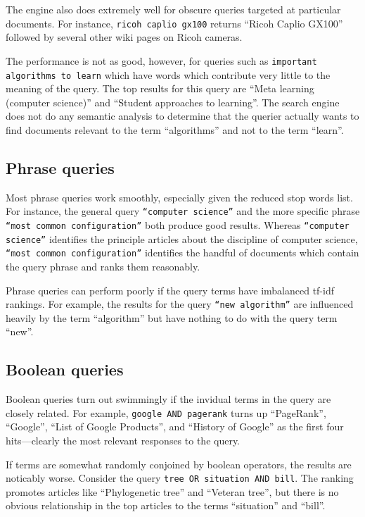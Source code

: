 \documentclass[11pt]{article}
\begin{document}
The engine also does extremely well for obscure queries targeted at particular documents.
For instance, \texttt{ricoh caplio gx100} returns ``Ricoh Caplio GX100'' followed by
several other wiki pages on Ricoh cameras.

The performance is not as good, however, for queries such as \texttt{important
algorithms to learn} which have words which contribute very little to the meaning of the query.
The top results for this query are ``Meta learning (computer science)'' and ``Student approaches
to learning''. The search engine does not do any semantic analysis to determine that the querier
actually wants to find documents relevant to the term ``algorithms'' and not to
the term ``learn''.

\subsection*{Phrase queries}

Most phrase queries work smoothly, especially given the reduced stop words list. For instance,
the general query \texttt{``computer science''} and the more specific phrase \texttt{``most common configuration''}
both produce good results. Whereas \texttt{``computer science''} identifies the principle articles
about the discipline of computer science, \texttt{``most common configuration''} identifies the handful of documents
which contain the query phrase and ranks them reasonably.

Phrase queries can perform poorly if the query terms have imbalanced tf-idf rankings. For example, the
results for the query \texttt{``new algorithm''} are influenced heavily by the term ``algorithm'' but have
nothing to do with the query term ``new''. 

\subsection*{Boolean queries}

Boolean queries turn out swimmingly if the invidual terms in the query are closely related. For example,
\texttt{google AND pagerank} turns up ``PageRank'', ``Google'', ``List of Google Products'', and
``History of Google'' as the first four hits---clearly the most relevant responses to the query.

If terms are somewhat randomly conjoined by boolean operators, the results are noticably worse.
Consider the query \texttt{tree OR situation AND bill}. The ranking promotes articles like
``Phylogenetic tree'' and ``Veteran tree'', but there is no obvious relationship in the
top articles to the terms ``situation'' and ``bill''.
\end{document}
